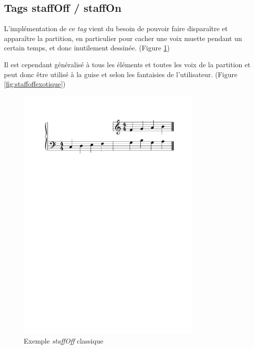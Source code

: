 \documentclass{article}
\newenvironment{gmncode}	{\vspace{-2mm}\small\verbatim}{\endverbatim\vspace{-2mm}}
\begin{document}
\subsection{Tags staffOff / staffOn}\label{subsec:staffoff}

\begin{gmncode}
[ ... \staffOff ... \staffOn ... ]
\end{gmncode}



L'implémentation de ce \emph{tag} vient du besoin de pouvoir faire disparaître et apparaître la partition, en particulier pour cacher une voix muette pendant un certain temps, et donc inutilement dessinée. (Figure \ref{fig:staffoffsimple}) 

Il est cependant généralisé à tous les éléments et toutes les voix de la partition et peut donc être utilisé à la guise et selon les fantaisies de l'utilisateur. (Figure \ref{fig:staffoffexotique})

\begin{figure}[h]
\centering
\includegraphics[width=9cm]{img/staffoff.pdf}
\caption{ Exemple \emph{staffOff} classique}
\label{fig:staffoffsimple}
\end{figure}
\end{document}
